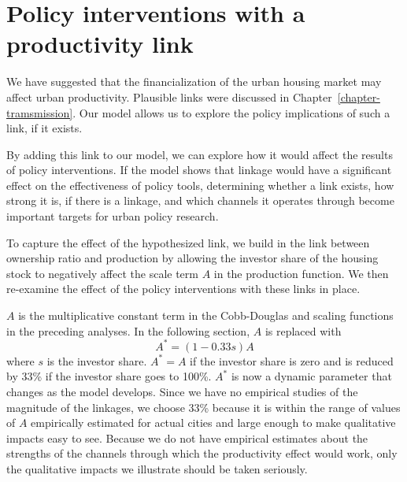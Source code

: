 \section{Policy interventions with a productivity link}


We have suggested that the financialization of the urban housing market may affect urban productivity. Plausible links were discussed in Chapter~\ref{chapter-tramsmission}. Our model allows us to explore the policy implications of such a link, if it exists. 


By adding this link to our model, we can explore how it would affect the results of policy interventions. If the model shows that linkage would have a significant effect on the effectiveness of policy tools, determining whether a link exists, how strong it is, if there is a linkage, and which channels it operates through become important targets for urban policy research.




To capture the effect of the hypothesized link, we build in the link between ownership ratio and production by allowing the investor share of the housing stock to negatively affect the scale term $A$ in the production function. We then re-examine the effect of the policy interventions with these links in place. 



$A$ is the multiplicative constant term in the Cobb-Douglas and scaling functions in the preceding analyses. In the following section, $A$  is replaced with   
\[A^*= (1-0.33s)A\]
where $s$ is the investor share. $A^*= A$ if the investor share is zero and is reduced by 33\% if the investor share goes to 100\%. $A^*$ is now a dynamic parameter that changes as the model develops. Since we have no empirical studies of the magnitude of the linkages, we choose 33\% because it is within the range of values of $A$ empirically estimated for actual cities and large enough to make qualitative impacts easy to see. Because we do not have empirical estimates about the strengths of the channels through which the productivity effect would work, only the qualitative impacts we illustrate should be taken seriously.  



